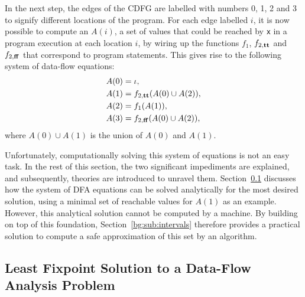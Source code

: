 In the next step, the edges of the CDFG are labelled with numbers 0, 1, 2
and 3 to signify different locations of the program.  For each edge labelled
$i$, it is now possible to compute an $A(i)$, a set of values that could be
reached by \verb|x| in a program execution at each location $i$, by wiring up
the functions $f_1$, $f_{2, \mathbf{tt}}$ and $f_{2, \mathbf{ff}}$ that correspond
to program statements.  This gives rise to the following system of data-flow
equations:
\begin{align}
    A(0) &= \iota,
        \label{bg:eq:dfa0} \\
    A(1) &= f_{2, \mathbf{tt}}(A(0) \cup A(2)),
        \label{bg:eq:dfa1} \\
    A(2) &= f_1(A(1)),
        \label{bg:eq:dfa2} \\
    A(3) &= f_{2, \mathbf{ff}}(A(0) \cup A(2)),
        \label{bg:eq:dfa3}
\end{align}
where $A(0) \cup A(1)$ is the union of $A(0)$ and $A(1)$.

Unfortunately, computationally solving this system of equations is not an
easy task.  In the rest of this section, the two significant impediments
are explained, and subsequently, theories are introduced to unravel them.
Section~\ref{bg:sub:lfp} discusses how the system of DFA equations can be
solved analytically for the most desired solution, using a minimal set of
reachable values for $A(1)$ as an example.  However, this analytical solution
cannot be computed by a machine.  By building on top of this foundation,
Section~\ref{bg:sub:intervals} therefore provides a practical solution to
compute a safe approximation of this set by an algorithm.


\subsection{Least Fixpoint Solution to a Data-Flow Analysis Problem}
\label{bg:sub:lfp}

